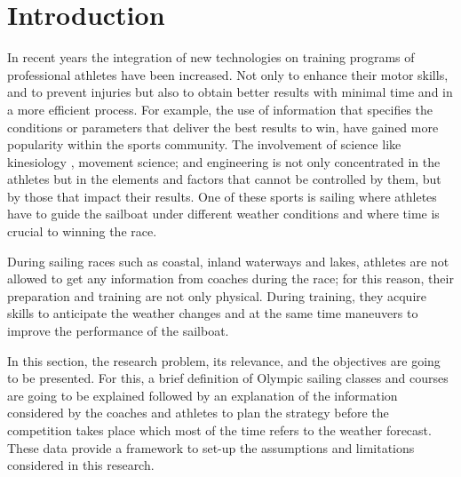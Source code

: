 \chapter{Introduction}  \label{ch:intro}


In recent years the integration of new technologies on training programs of professional athletes have been increased. Not only to enhance their motor skills, and to prevent injuries but also to obtain better results with minimal time and in a more efficient process. For example, the use of information that specifies the conditions or parameters that deliver the best results to win, have gained more popularity within the sports community. The involvement of science like kinesiology \cite{sjogaard2015science}, movement science; and engineering is not only concentrated in the athletes but in the elements and factors that cannot be controlled by them, but by those that impact their results. One of these sports is sailing where athletes have to guide the sailboat under different weather conditions and where time is crucial to winning the race.\par
During sailing races such as coastal, inland waterways and lakes, athletes are not allowed to get any information from coaches during the race; for this reason, their preparation and training are not only physical. During training, they acquire skills to anticipate the weather changes and at the same time maneuvers to improve the performance of the sailboat. \par
In this section, the research problem, its relevance, and the objectives are going to be presented. For this, a brief definition of Olympic sailing classes and courses are going to be explained followed by an explanation of the information considered by the coaches and athletes to plan the strategy before the competition takes place which most of the time refers to the weather forecast. These data provide a framework to set-up the assumptions and limitations considered in this research. \par 
